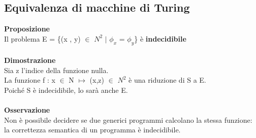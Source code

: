 \subsection{Equivalenza di macchine di Turing}
\textbf{Proposizione}\\
Il problema E = \{(x , y) $\in$ $N^2$ $|$ $\phi_x$ = $\phi_y$\} è \textbf{indecidibile}\\\\
\textbf{Dimostrazione}\\
Sia z l’indice della funzione nulla.\\
La funzione f : x $\in$ N $\mapsto$ (x,z) $\in$ $N^2$ è una riduzione di S a E.\\
Poiché S è indecidibile, lo sarà anche E.\\\\
\textbf{Osservazione}\\
Non è possibile decidere se due generici programmi calcolano la stessa funzione: la correttezza semantica di un programma è indecidibile.






